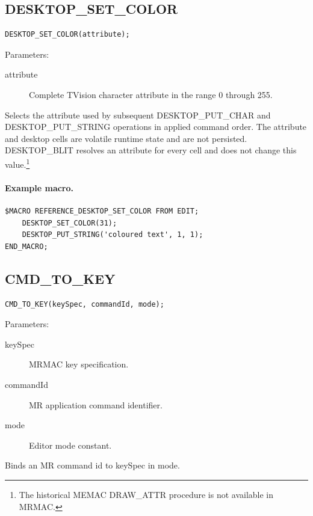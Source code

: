 \documentclass[a4paper,10pt,twoside,openany]{book}
\newenvironment{mrmacextension}{\begin{changebar}}{\end{changebar}}
\begin{document}
\begin{mrmacextension}
\label{prim:procedure-desktop-set-color}
\subsection*{DESKTOP\_SET\_COLOR}
\begin{verbatim}
DESKTOP_SET_COLOR(attribute);
\end{verbatim}
Parameters:
\begin{description}
\item[attribute] Complete TVision character attribute in the range 0 through
255.
\end{description}

Selects the attribute used by subsequent DESKTOP\_PUT\_CHAR and
DESKTOP\_PUT\_STRING operations in applied command order. The
attribute and desktop cells are volatile runtime state and are not persisted.
DESKTOP\_BLIT resolves an attribute for every cell and does not change this
value.\footnote{The historical MEMAC DRAW\_ATTR procedure is not available in
MRMAC.}

\paragraph{Example macro.}
\begin{verbatim}
$MACRO REFERENCE_DESKTOP_SET_COLOR FROM EDIT;
    DESKTOP_SET_COLOR(31);
    DESKTOP_PUT_STRING('coloured text', 1, 1);
END_MACRO;
\end{verbatim}
\end{mrmacextension}

\label{prim:procedure-cmd-to-key}
\subsection*{CMD\_TO\_KEY}
\begin{verbatim}
CMD_TO_KEY(keySpec, commandId, mode);
\end{verbatim}
Parameters:
\begin{description}
\item[keySpec] MRMAC key specification.
\item[commandId] MR application command identifier.
\item[mode] Editor mode constant.
\end{description}

Binds an MR command id to keySpec in mode.
\end{document}
